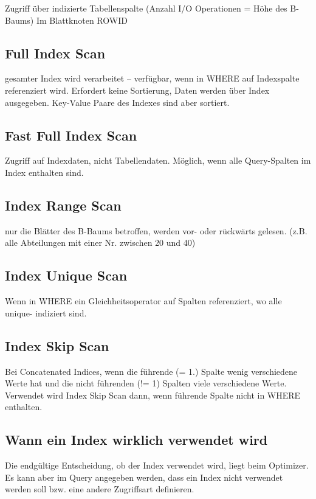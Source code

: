 Zugriff über indizierte Tabellenspalte (Anzahl I/O Operationen = Höhe des B-Baums) Im Blattknoten ROWID

\subsection{Full Index Scan}

gesamter Index wird verarbeitet – verfügbar, wenn in WHERE auf Indexspalte referenziert wird. Erfordert keine Sortierung, Daten werden über Index ausgegeben.
 Key-Value Paare des Indexes sind aber sortiert.

 \subsection{Fast Full Index Scan}

 Zugriff auf Indexdaten, nicht Tabellendaten. Möglich, wenn alle Query-Spalten im Index enthalten sind.

 \subsection{Index Range Scan}

 nur die Blätter des B-Baums betroffen, werden vor- oder rückwärts gelesen. (z.B. alle Abteilungen mit einer Nr. zwischen 20 und 40)

 \subsection{Index Unique Scan}

 Wenn in WHERE ein Gleichheitsoperator auf Spalten referenziert, wo alle unique- indiziert sind.

 \subsection{Index Skip Scan}

 Bei Concatenated Indices, wenn die führende (= 1.) Spalte wenig verschiedene Werte hat und die nicht führenden (!= 1) Spalten viele verschiedene Werte. Verwendet wird Index Skip Scan dann, wenn führende Spalte nicht in WHERE enthalten.

 \subsection{Wann ein Index wirklich verwendet wird}

 Die endgültige Entscheidung, ob der Index verwendet wird, liegt beim Optimizer.
Es kann aber im Query angegeben werden, dass ein Index nicht verwendet werden soll bzw. eine andere Zugriffsart definieren.

